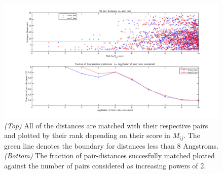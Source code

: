 \documentclass[paper=a4, fontsize=10pt]{article} %
\numberwithin{equation}{section} %
\numberwithin{figure}{section} %
\numberwithin{table}{section} %
\begin{document}
\begin{figure}
\centering
\includegraphics[width=\textwidth]{Results.png}
\caption{\label{fig:4}  
\emph{(Top)} All of the distances are matched with their respective pairs and plotted by their rank depending on their score in $M_{ij}$. The green line denotes the
boundary for distances less than 8 Angstroms. \emph{(Bottom)} The fraction of pair-distances succesfully matched plotted against the number of pairs considered as increasing powers of 2. 
}
\end{figure}
\end{document}

